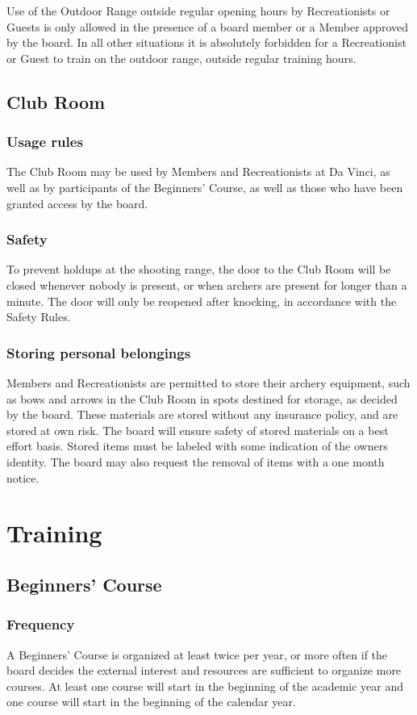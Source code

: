 \documentclass[a4paper]{article}
\newcommand{\Asr}{Safety Rules} %
\begin{document}
Use of the Outdoor Range outside regular opening hours by Recreationists or Guests is only allowed in the presence of a  board member or a Member approved by the board. In all other situations it is absolutely forbidden for a Recreationist or Guest to train on the outdoor range, outside regular training hours. 


\subsection{Club Room}
\subsubsection{Usage rules}
The Club Room may be used by Members and Recreationists at Da Vinci, as well as by participants of the Beginners' Course, as well as those who have been granted access by the board. 

\subsubsection{Safety}
To prevent holdups at the shooting range, the door to the Club Room will be closed whenever nobody is present, or when archers are present for longer than a minute. The door will only be reopened after knocking, in accordance with the \Asr .

\subsubsection{Storing personal belongings}
Members and Recreationists are permitted to store their archery equipment, such as bows and arrows in the Club Room in spots destined for storage, as decided by the board. These materials are stored without any insurance policy, and are stored at own risk. The board will ensure safety of stored materials on a best effort basis. Stored items must be labeled with some indication of the owners identity. The board may also request the removal of items with a one month notice.


\section{Training}
\subsection{Beginners' Course}
\subsubsection{Frequency}
A Beginners' Course is organized at least twice per year, or more often if the board decides the external interest and resources are sufficient to organize more courses. At least one course will start in the beginning of the academic year and one course will start in the beginning of the calendar year.
\end{document}
